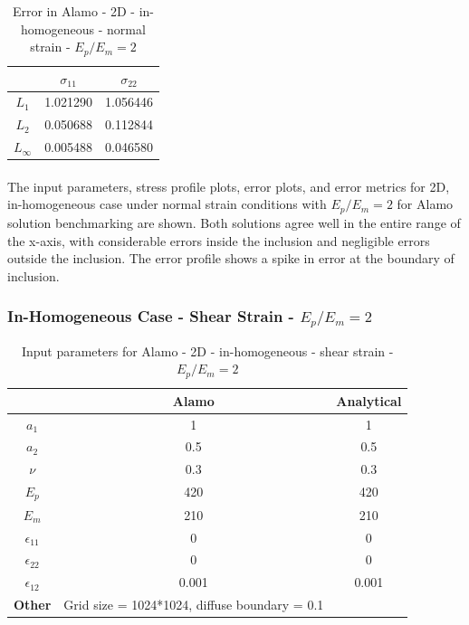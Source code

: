 \documentclass[12pt, a4paper]{report}
\begin{document}
\begin{table}[H]
    \centering
    \begin{tabular}{|c|c|c|}
        \hline
        &\textbf{$\sigma_{11}$} &  \textbf{$\sigma_{22}$} \\
        \hline
        $L_1$ & 1.021290 & 1.056446 \\
        \hline
        $L_2$ & 0.050688 & 0.112844  \\
        \hline 
        $L_\infty$ & 0.005488 & 0.046580 \\
        \hline
    \end{tabular}
    \caption{Error in Alamo - 2D - in-homogeneous - normal strain - $E_p/E_m = 2$}
\end{table}

\paragraph{}
The input parameters, stress profile plots, error plots, and error metrics for 2D, in-homogeneous case under normal strain conditions with $E_p/E_m = 2$ for Alamo solution benchmarking are shown. Both solutions agree well in the entire range of the x-axis, with considerable errors inside the inclusion and negligible errors outside the inclusion. The error profile shows a spike in error at the boundary of inclusion.

\newpage

\subsubsection{In-Homogeneous Case - Shear Strain - $E_p/E_m = 2$}
\begin{table}[H]
    \centering
    \begin{tabular}{|c|c|c|}
        \hline
        & \textbf{Alamo} &\textbf{Analytical}\\
        \hline
        \textbf{$a_1$} & 1 & 1 \\
        \hline
        \textbf{$a_2$} & 0.5 & 0.5 \\
        \hline
        \textbf{$\nu$} & 0.3 & 0.3 \\
        \hline
        \textbf{$E_p$} & 420 & 420 \\
        \hline
        \textbf{$E_m$} & 210 & 210 \\
        \hline
        \textbf{$\epsilon_{11}$} & 0 & 0 \\
        \hline
        \textbf{$\epsilon_{22}$} & 0 & 0 \\
        \hline
        \textbf{$\epsilon_{12}$} & 0.001 & 0.001 \\
        \hline
        \textbf{Other} & Grid size = 1024*1024, diffuse boundary = 0.1&  \\
        \hline
    \end{tabular}
    \caption{Input parameters for Alamo - 2D - in-homogeneous - shear strain - $E_p/E_m = 2$}
\end{table}
\end{document}
